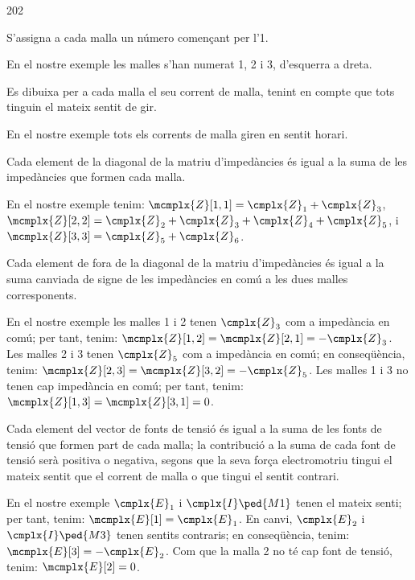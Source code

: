 \begin{dingautolist}{202}
   \item S'assigna a cada malla un número començant per l'1.

          En el nostre exemple les malles s'han numerat 1, 2 i 3, d'esquerra a dreta.
   \item Es dibuixa per a  cada malla el seu corrent de malla, tenint en compte que tots tinguin el mateix sentit de gir.

       En el nostre exemple tots els corrents de malla giren en sentit horari.
   \item Cada element de la diagonal de la matriu d'impedàncies és igual a la suma de les impedàncies que formen cada malla.

       En el nostre exemple tenim: $\mcmplx{Z}[1,1]=\cmplx{Z}_1 + \cmplx{Z}_3$, $\mcmplx{Z}[2,2]=\cmplx{Z}_2 + \cmplx{Z}_3+ \cmplx{Z}_4+ \cmplx{Z}_5$, i $\mcmplx{Z}[3,3]=\cmplx{Z}_5 + \cmplx{Z}_6$.
   \item Cada element de fora de la diagonal de la matriu d'impedàncies és igual a la suma canviada de signe de les impedàncies en comú a les dues malles corresponents.

        En el nostre exemple les malles 1 i 2 tenen $\cmplx{Z}_3$ com a impedància en comú; per tant, tenim: $\mcmplx{Z}[1,2]=\mcmplx{Z}[2,1]= -\cmplx{Z}_3$. Les malles 2 i 3 tenen $\cmplx{Z}_5$ com a impedància en comú; en conseqüència,  tenim: $\mcmplx{Z}[2,3]=\mcmplx{Z}[3,2]= -\cmplx{Z}_5$. Les malles 1 i 3 no tenen cap impedància en comú;  per tant,  tenim: $\mcmplx{Z}[1,3]=\mcmplx{Z}[3,1]= 0$.
    \item Cada element del vector de fonts de tensió és igual a la suma de les fonts de tensió que formen part de cada malla; la contribució a la suma de cada font de tensió serà positiva o negativa, segons que la seva força electromotriu tingui el mateix sentit que el corrent de malla o que  tingui el sentit contrari.

         En el nostre exemple $\cmplx{E}_1$ i $\cmplx{I}\ped{M1}$ tenen el mateix senti; per tant, tenim:   $\mcmplx{E}[1] = \cmplx{E}_1$. En canvi, $\cmplx{E}_2$ i $\cmplx{I}\ped{M3}$ tenen   sentits contraris; en conseqüència,   tenim:   $\mcmplx{E}[3] = -\cmplx{E}_2$. Com que la malla 2 no té cap font de tensió,  tenim:   $\mcmplx{E}[2] = 0$.
\end{dingautolist}


